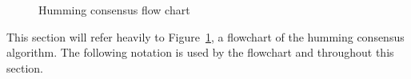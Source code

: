 \documentclass[preprint,10pt]{sigplanconf}
\begin{document}
\begin{figure}[htp]
\caption{Humming consensus flow chart}
\label{fig:flowchart}
\end{figure}

This section will refer heavily to Figure~\ref{fig:flowchart}, a
flowchart of the humming consensus algorithm.  The following notation
is used by the flowchart and throughout this section.
\end{document}
